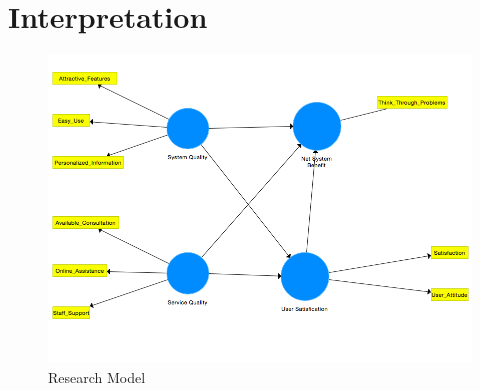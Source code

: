 \section{Interpretation}
\label{sec:vergleich}
\lipsum[11]
\lipsum[12]

\begin{figure}[h]
\centering
\includegraphics[width=1\textwidth]{Grafiken/Research_Model.png}
\caption{Research Model}
\label{Research Model}
\end{figure}